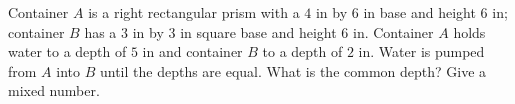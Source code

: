 Container $A$ is a right rectangular prism with a $4$ in by $6$ in base and height $6$ in; container $B$ has a $3$ in by $3$ in square base and height $6$ in. Container $A$ holds water to a depth of $5$ in and container $B$ to a depth of $2$ in. Water is pumped from $A$ into $B$ until the depths are equal. What is the common depth? Give a mixed number.
